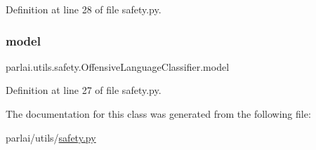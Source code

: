 Definition at line 28 of file safety.\+py.

\mbox{\label{classparlai_1_1utils_1_1safety_1_1OffensiveLanguageClassifier_a917240edc6718f3b7f3560214780ac9d}} 
\subsubsection{\texorpdfstring{model}{model}}
{\footnotesize\ttfamily parlai.\+utils.\+safety.\+Offensive\+Language\+Classifier.\+model}



Definition at line 27 of file safety.\+py.



The documentation for this class was generated from the following file\+:\begin{DoxyCompactItemize}
\item 
parlai/utils/\hyperlink{safety_8py}{safety.\+py}\end{DoxyCompactItemize}
